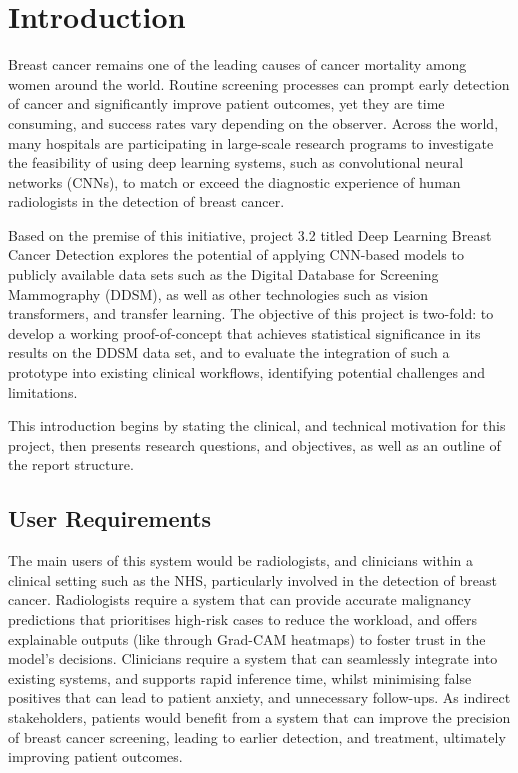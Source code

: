 \documentclass[main]{subfiles}
\begin{document}
\chapter{Introduction}
\label{chap:introduction}
Breast cancer remains one of the leading causes of cancer mortality among women around the world. Routine screening processes can prompt early detection of cancer and significantly improve patient outcomes, yet they are time consuming, and success rates vary depending on the observer. Across the world, many hospitals are participating in large-scale research programs to investigate the feasibility of using deep learning systems, such as convolutional neural networks (CNNs), to match or exceed the diagnostic experience of human radiologists in the detection of breast cancer.

Based on the premise of this initiative, project 3.2 titled \textemdash Deep Learning Breast Cancer Detection explores the potential of applying CNN-based models to publicly available data sets such as the Digital Database for Screening Mammography (DDSM), as well as other technologies such as vision transformers, and transfer learning. The objective of this project is two-fold: to develop a working proof-of-concept that achieves statistical significance in its results on the DDSM data set, and to evaluate the integration of such a prototype into existing clinical workflows, identifying potential challenges and limitations.

This introduction begins by stating the clinical, and technical motivation for this project, then presents research questions, and objectives, as well as an outline of the report structure.

\section{User Requirements}
\label{sec:intro_user_requirements}
The main users of this system would be radiologists, and clinicians within a clinical setting such as the NHS, particularly involved in the detection of breast cancer. Radiologists require a system that can provide accurate malignancy predictions that prioritises high-risk cases to reduce the workload, and offers explainable outputs (like through Grad-CAM heatmaps) to foster trust in the model's decisions. Clinicians require a system that can seamlessly integrate into existing systems, and supports rapid inference time, whilst minimising false positives that can lead to patient anxiety, and unnecessary follow-ups. As indirect stakeholders, patients would benefit from a system that can improve the precision of breast cancer screening, leading to earlier detection, and treatment, ultimately improving patient outcomes.
\end{document}
